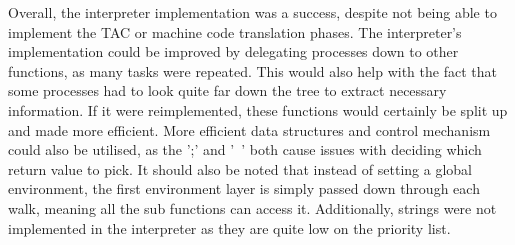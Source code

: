\documentclass[11pt]{article}
\begin{document}
Overall, the interpreter implementation was a success, despite not being able to implement the TAC or machine code translation phases. The interpreter's implementation could be improved by delegating processes down to other functions, as many tasks were repeated. This would also help with the fact that some processes had to look quite far down the tree to extract necessary information. If it were reimplemented, these functions would certainly be split up and made more efficient. More efficient data structures and control mechanism could also be utilised, as the ';' and '~' both cause issues with deciding which return value to pick.  It should also be noted that instead of setting a global environment, the first environment layer is simply passed down through each walk, meaning all the sub functions can access it. Additionally, strings were not implemented in the interpreter as they are quite low on the priority list. 
\end{document}
